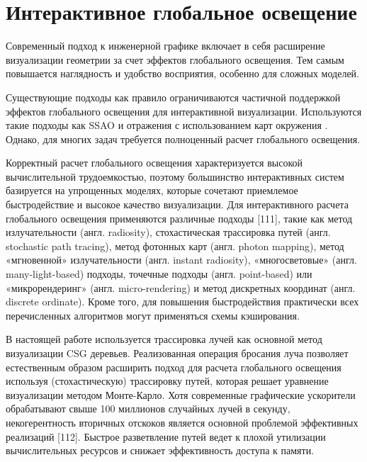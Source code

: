 \section{Интерактивное глобальное освещение} \label{sect_GI}

Современный подход к инженерной графике включает в себя расширение визуализации геометрии за счет эффектов глобального освещения. Тем самым повышается наглядность и удобство восприятия, особенно для сложных моделей.


Существующие подходы как правило ограничиваются частичной поддержкой эффектов глобального освещения для интерактивной визуализации. Используются такие подходы как SSAO и отражения с использованием карт окружения . Однако, для многих задач требуется полноценный расчет глобального освещения.

Корректный расчет глобального освещения характеризуется высокой вычислительной трудоемкостью, поэтому большинство интерактивных систем базируется на упрощенных моделях, которые сочетают приемлемое быстродействие и высокое качество визуализации. Для интерактивного расчета глобального освещения применяются различные подходы [111], такие как метод излучательности (англ. radiosity), стохастическая трассировка путей (англ. stochastic path tracing), метод фотонных карт (англ. photon mapping), метод «мгновенной» излучательности (англ. instant radiosity), «многосветовые» (англ. many-light-based) подходы, точечные подходы (англ. point-based) или «микрорендеринг» (англ. micro-rendering) и метод дискретных координат (англ. discrete ordinate). Кроме того, для повышения быстродействия практически всех перечисленных алгоритмов могут применяться схемы кэширования.

В настоящей работе используется трассировка лучей как основной метод визуализации CSG деревьев. Реализованная операция бросания луча позволяет естественным образом расширить подход для расчета глобального освещения используя (стохастическую) трассировку путей, которая решает уравнение визуализации методом Монте-Карло. Хотя современные графические ускорители обрабатывают свыше 100 миллионов случайных лучей в секунду, некогерентность вторичных отскоков является основной проблемой эффективных реализаций [112]. Быстрое разветвление путей ведет к плохой утилизации вычислительных ресурсов и снижает эффективность доступа к памяти.



